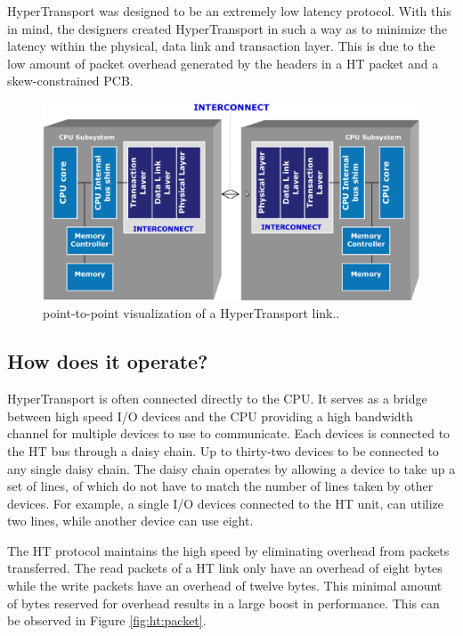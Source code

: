 \documentclass[conference]{IEEEtran}
\begin{document}
HyperTransport was designed to be an extremely low latency protocol. With this
in mind, the designers created HyperTransport in such a way as to minimize the
latency within the physical, data link and transaction layer. This is due to
the low amount of packet overhead generated by the headers in a HT packet and a
skew-constrained PCB.

\begin{figure}[!t]
	\begin{center}
		\includegraphics[scale=.15]{htDiagram}
	\end{center}
	\caption{point-to-point visualization of a
	HyperTransport link.\cite{holden2006latency}.}
	\label{fig:ht:diagram}
\end{figure}

\subsection{How does it operate?}
\label{subsec:ht:oper}


HyperTransport is often connected directly to the CPU. It serves as a bridge
between high speed I/O devices and the CPU providing a high bandwidth channel for
multiple devices to use to communicate. Each devices is connected to the HT bus
through a daisy chain. Up to thirty-two devices to be connected to any single
daisy chain. The daisy chain operates by allowing a device to take up a set of lines,
of which do not have to match the number of lines taken by other devices. For
example, a single I/O devices connected to the HT unit, can utilize two lines,
while another device can use eight. 

The HT protocol maintains the high speed by eliminating overhead from packets
transferred. The read packets of a HT link only have an overhead of eight bytes
while the write packets have an overhead of twelve bytes. This minimal amount of
bytes reserved for overhead results in a large boost in performance. This can be
observed in Figure \ref{fig:ht:packet}.
\end{document}
